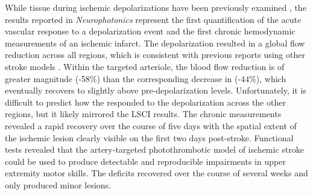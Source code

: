 While tissue  during ischemic depolarizations have been previously examined \cite{vonBornstadt:2015dj}, the results reported in \textit{Neurophotonics} \cite{Sullender:2018ff} represent the first quantification of the acute vascular  response to a depolarization event and the first chronic hemodynamic measurements of an ischemic infarct. The depolarization resulted in a global flow reduction across all regions, which is consistent with previous reports using other stroke models \cite{Shin:2006dc,Nakamura:2010wp}. Within the targeted arteriole, the blood flow reduction is of greater magnitude (-58\%) than the corresponding decrease in  (-44\%), which eventually recovers to slightly above pre-depolarization levels. Unfortunately, it is difficult to predict how the  responded to the depolarization across the other regions, but it likely mirrored the LSCI results. The chronic measurements revealed a rapid recovery over the course of five days with the spatial extent of the ischemic lesion clearly visible on the first two days post-stroke. Functional tests revealed that the artery-targeted photothrombotic model of ischemic stroke could be used to produce detectable and reproducible impairments in upper extremity motor skills. The deficits recovered over the course of several weeks and only produced minor lesions.



